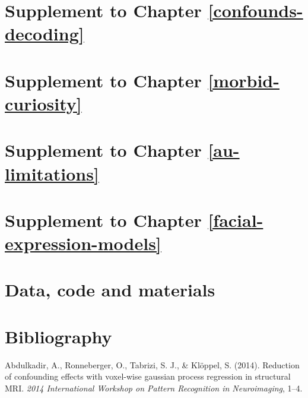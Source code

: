 \documentclass[12pt,american,a4paper,oneside,]{memoir} %
\begin{document}
\hypertarget{confounds-decoding-supplement}{%
\chapter{Supplement to Chapter \ref{confounds-decoding}}\label{confounds-decoding-supplement}}

\hypertarget{morbid-curiosity-supplement}{%
\chapter{Supplement to Chapter \ref{morbid-curiosity}}\label{morbid-curiosity-supplement}}

\hypertarget{au-limitations-supplement}{%
\chapter{Supplement to Chapter \ref{au-limitations}}\label{au-limitations-supplement}}

\hypertarget{facial-expression-models-supplement}{%
\chapter{Supplement to Chapter \ref{facial-expression-models}}\label{facial-expression-models-supplement}}

\hypertarget{resources-supplement}{%
\chapter{Data, code and materials}\label{resources-supplement}}

\backmatter

\hypertarget{bibliography}{%
\chapter*{Bibliography}\label{bibliography}}

\begingroup
\hspace{\parindent}
\setlength{\parindent}{-0.25in}
\setlength{\leftskip}{0.25in}
\setlength{\parskip}{0pt}

\hypertarget{refs}{}
\leavevmode\hypertarget{ref-Abdulkadir2014-bh}{}%
Abdulkadir, A., Ronneberger, O., Tabrizi, S. J., \& Klöppel, S. (2014). Reduction of confounding effects with voxel-wise gaussian process regression in structural MRI. \emph{2014 International Workshop on Pattern Recognition in Neuroimaging}, 1--4.
\end{document}
